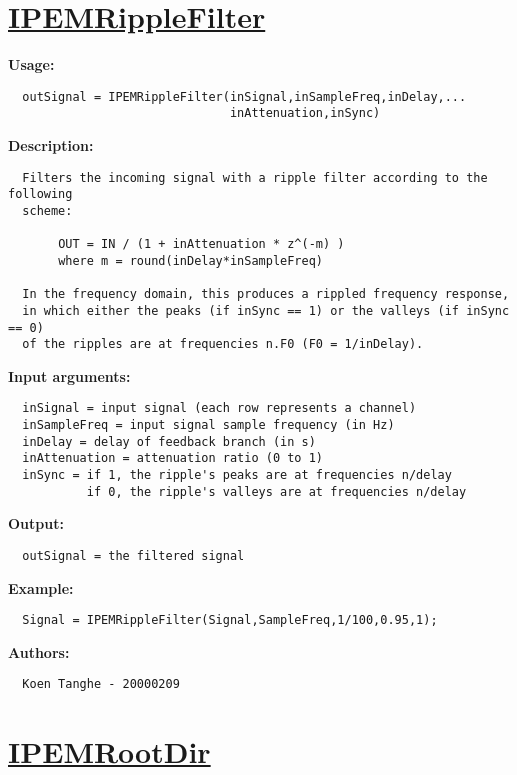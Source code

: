 \newpage
\section*{\hyperlink{Concepts:IPEMRippleFilter}{IPEMRippleFilter}}
\hypertarget{FuncRef:IPEMRippleFilter}{}

\textbf{Usage:}
\begin{verbatim}  outSignal = IPEMRippleFilter(inSignal,inSampleFreq,inDelay,...
                               inAttenuation,inSync)

\end{verbatim}
\textbf{Description:}
\begin{verbatim}  Filters the incoming signal with a ripple filter according to the following
  scheme:

       OUT = IN / (1 + inAttenuation * z^(-m) )
       where m = round(inDelay*inSampleFreq)

  In the frequency domain, this produces a rippled frequency response,
  in which either the peaks (if inSync == 1) or the valleys (if inSync == 0)
  of the ripples are at frequencies n.F0 (F0 = 1/inDelay).

\end{verbatim}
\textbf{Input arguments:}
\begin{verbatim}  inSignal = input signal (each row represents a channel)
  inSampleFreq = input signal sample frequency (in Hz)
  inDelay = delay of feedback branch (in s)
  inAttenuation = attenuation ratio (0 to 1)
  inSync = if 1, the ripple's peaks are at frequencies n/delay
           if 0, the ripple's valleys are at frequencies n/delay

\end{verbatim}
\textbf{Output:}
\begin{verbatim}  outSignal = the filtered signal

\end{verbatim}
\textbf{Example:}
\begin{verbatim}  Signal = IPEMRippleFilter(Signal,SampleFreq,1/100,0.95,1);

\end{verbatim}
\textbf{Authors:}
\begin{verbatim}  Koen Tanghe - 20000209
\end{verbatim}


\newpage
\section*{\hyperlink{Concepts:IPEMRootDir}{IPEMRootDir}}
\hypertarget{FuncRef:IPEMRootDir}{}


